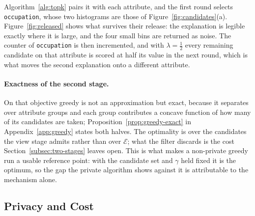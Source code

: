 Algorithm~\ref{alg:topk} pairs it with each attribute, and the first round selects \texttt{occupation}, whose two histograms are those of Figure~\ref{fig:candidates}(a).
Figure~\ref{fig:released} shows what survives their release: the explanation is legible exactly where it is large, and the four small bins are returned as noise.
The counter of \texttt{occupation} is then incremented, and with $\lambda=\tfrac12$ every remaining candidate on that attribute is scored at half its value in the next round, which is what moves the second explanation onto a different attribute.

\paragraph{Exactness of the second stage.}
On that objective greedy is not an approximation but exact, because it separates over attribute groups and each group contributes a concave function of how many of its candidates are taken; Proposition~\ref{prop:greedy-exact} in Appendix~\ref{app:greedy} states both halves.
The optimality is over the candidates the view stage admits rather than over $\mathcal{E}$; what the filter discards is the cost Section~\ref{subsec:two-stages} leaves open.
This is what makes a non-private greedy run a usable reference point: with the candidate set and $\gamma$ held fixed it is the optimum, so the gap the private algorithm shows against it is attributable to the mechanism alone.

\subsection{Privacy and Cost}
\label{subsec:dp-proof}

